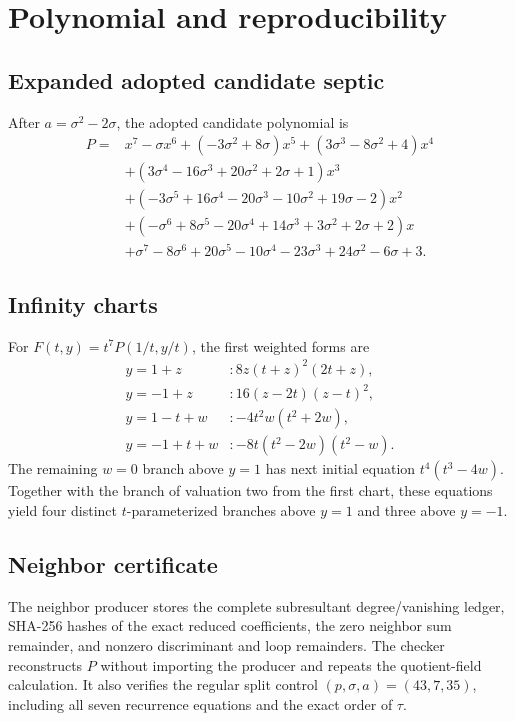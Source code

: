 \section{Polynomial and reproducibility}

\subsection{Expanded adopted candidate septic}\label{app:poly}

After $a=\sigma^2-2\sigma$, the adopted candidate polynomial is
\begin{align*}
P={}&x^7-\sigma x^6+(-3\sigma^2+8\sigma)x^5
 +(3\sigma^3-8\sigma^2+4)x^4\\
&+(3\sigma^4-16\sigma^3+20\sigma^2+2\sigma+1)x^3\\
&+(-3\sigma^5+16\sigma^4-20\sigma^3-10\sigma^2+19\sigma-2)x^2\\
&+(-\sigma^6+8\sigma^5-20\sigma^4+14\sigma^3+3\sigma^2+2\sigma+2)x\\
&+\sigma^7-8\sigma^6+20\sigma^5-10\sigma^4-23\sigma^3
 +24\sigma^2-6\sigma+3.
\end{align*}

\subsection{Infinity charts}\label{app:infinity}

For $F(t,y)=t^7P(1/t,y/t)$, the first weighted forms are
\begin{align*}
y=1+z &: 8z(t+z)^2(2t+z),\\
y=-1+z &:16(z-2t)(z-t)^2,\\
y=1-t+w &: -4t^2w(t^2+2w),\\
y=-1+t+w &: -8t(t^2-2w)(t^2-w).
\end{align*}
The remaining $w=0$ branch above $y=1$ has next initial equation
$t^4(t^3-4w)$.  Together with the branch of valuation two from the first
chart, these equations yield four distinct $t$-parameterized branches above
$y=1$ and three above $y=-1$.

\subsection{Neighbor certificate}\label{app:neighbor}

The neighbor producer stores the complete subresultant degree/vanishing
ledger, SHA-256 hashes of the exact reduced coefficients, the zero neighbor
sum remainder, and nonzero discriminant and loop remainders.  The checker
reconstructs $P$ without importing the producer and repeats the quotient-field
calculation.  It also verifies the regular split control
$(p,\sigma,a)=(43,7,35)$, including all seven recurrence equations and the
exact order of $\tau$.

